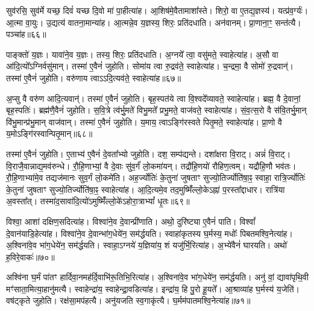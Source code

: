 सुव॑रसि॒ सुव॑र्मे यच्छ॒ दिवं॑ यच्छ दि॒वो मा॑ पा॒हीत्या॑ह। 
आ॒शिष॑मे॒वैतामाशा᳚स्ते। 
शिरो॒ वा ए॒तद्य॒ज्ञस्य॑। 
यत्प्र॑व॒र्ग्यः॑। 
आ॒त्मा वा॒युः। 
उ॒द्यत्य॑ वातना॒मान्या॑ह। 
आ॒त्मन्ने॒व य॒ज्ञस्य॒ शिरः॒ प्रति॑दधाति। 
अन॑वानम्। 
प्रा॒णाना॒ꣳ॒ सन्त॑त्यै। 
पञ्चा॑ह॥६६॥

पाङ्क्तो॑ य॒ज्ञः। 
यावा॑ने॒व य॒ज्ञः। 
तस्य॒ शिरः॒ प्रति॑दधाति। 
अ॒ग्नये᳚ त्वा॒ वसु॑मते॒ स्वाहेत्या॑ह। 
अ॒सौ वा आ॑दि॒त्यो᳚ऽग्निर्वसु॑मान्। 
तस्मा॑ ए॒वैनं॑ जुहोति। 
सोमा॑य त्वा रु॒द्रव॑ते॒ स्वाहेत्या॑ह। 
च॒न्द्रमा॒ वै सोमो॑ रु॒द्रवान्॑। 
तस्मा॑ ए॒वैनं॑ जुहोति। 
वरु॑णाय त्वाऽऽदि॒त्यव॑ते॒ स्वाहेत्या॑ह॥६७॥

अ॒प्सु वै वरु॑ण आदि॒त्यवान्॑। 
तस्मा॑ ए॒वैनं॑ जुहोति। 
बृह॒स्पत॑ये त्वा वि॒श्वदे᳚व्यावते॒ स्वाहेत्या॑ह। 
ब्रह्म॒ वै दे॒वानां॒ बृह॒स्पतिः॑। 
ब्रह्म॑णै॒वैनं॑ जुहोति। 
स॒वि॒त्रे त्व॑र्भु॒मते॑ विभु॒मते᳚ प्रभु॒मते॒ वाज॑वते॒ स्वाहेत्या॑ह। 
सं॒व॒त्स॒रो वै स॑वि॒तर्भु॒मान् वि॑भु॒मान्प्र॑भु॒मान् वाज॑वान्। 
तस्मा॑ ए॒वैनं॑ जुहोति। 
य॒माय॒ त्वाऽङ्गि॑रस्वते पितृ॒मते॒ स्वाहेत्या॑ह। 
प्रा॒णो वै य॒मोऽङ्गि॑रस्वान्पितृ॒मान्॥६८॥

तस्मा॑ ए॒वैनं॑ जुहोति। 
ए॒ताभ्य॑ ए॒वैनं॑ दे॒वता᳚भ्यो जुहोति। 
दश॒ सम्प॑द्यन्ते। 
दशा᳚क्षरा वि॒राट्। 
अन्नं॑  वि॒राट्। 
वि॒राजै॒वान्नाद्य॒मव॑रुन्धे। 
रौ॒हि॒णाभ्यां॒ वै दे॒वाः सु॑व॒र्गं॑ लो॒कमा॑यन्। 
तद्रौ॑हि॒णयो॑ रौहिण॒त्वम्। 
यद्रौ॑हि॒णौ भव॑तः। 
रौ॒हि॒णाभ्या॑मे॒व तद्यज॑मानः सुव॒र्गं लो॒कमे॑ति। 
अह॒र्ज्योतिः॑ के॒तुना॑ जुषताꣳ सुज्यो॒तिर्ज्योति॑षा॒ꣴ॒ स्वाहा॒ रात्रि॒र्ज्योतिः॑ के॒तुना॑ जुषताꣳ सुज्यो॒तिर्ज्योति॑षा॒ꣴ॒ स्वाहेत्या॑ह। 
आ॒दि॒त्यमे॒व तद॒मुष्मिँ॑ल्लो॒केऽह्ना॑ प॒रस्ता᳚द्दाधार। 
रात्रि॑या अ॒वस्ता᳚त्। 
तस्मा॑द॒सावा॑दि॒त्यो॑ऽमुष्मिँ॑ल्लो॒के॑ऽहोरा॒त्राभ्यां᳚ धृ॒तः॥६९॥
\anuvakamend[म॒नु॒ष्य॒ना॒मानि॑ प॒शवः॑ सीद॒त्वित्या॒हेन्द्रा॒येत्या॑हार्द्धयति घ्नन्ति गृह्णा॒त्यहिꣳ॑सायै॒ पञ्चा॑ऽहादि॒त्यव॑ते॒ स्वाहेत्या॑ह पितृ॒माने॑ति च॒त्वारि॑ च]

विश्वा॒ आशा॑ दक्षिण॒सदित्या॑ह। 
विश्वा॑ने॒व दे॒वान्प्री॑णाति। 
अथो॒ दुरि॑ष्ट्या ए॒वैनं॑ पाति। 
विश्वां᳚ दे॒वान॑याडि॒हेत्या॑ह। 
विश्वा॑ने॒व दे॒वान्भा॑ग॒धेये॑न॒ सम॑र्द्धयति। 
स्वाहा॑कृतस्य घ॒र्मस्य॒ मधोः᳚ पिबतमश्वि॒नेत्या॑ह। 
अ॒श्विना॑वे॒व भा॑ग॒धेये॑न॒ सम॑र्द्धयति। 
स्वाहा॒ऽग्नये॑ य॒ज्ञिया॑य॒ शं यजु॑र्भि॒रित्या॑ह। 
अ॒भ्ये॑वैनं॑ घारयति। 
अथो॑ ह॒विरे॒वाकः॑॥७०॥

अश्वि॑ना घ॒र्मं पा॑तꣳ हार्दिवा॒नमह॑र्दि॒वाभि॑रू॒तिभि॒रित्या॑ह। 
अ॒श्विना॑वे॒व भा॑ग॒धेये॑न॒ सम॑र्द्धयति। 
अनु॑ वां॒ द्यावा॑पृथि॒वी मꣳ॑साता॒मित्या॒हानु॑मत्यै। 
स्वाहेन्द्रा॑य॒ स्वाहेन्द्रा॒वडित्या॑ह। 
इन्द्रा॑य॒ हि पु॒रो हू॒यते᳚। 
आ॒श्राव्या॑ह घ॒र्मस्य॑ य॒जेति॑। 
वष॑ट्कृते जुहोति। 
रक्ष॑सा॒मप॑हत्यै। 
अनु॑यजति स्व॒गाकृ॑त्यै। 
घ॒र्मम॑पातमश्वि॒नेत्या॑ह॥७१॥

